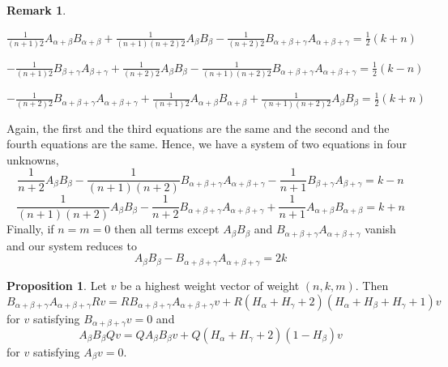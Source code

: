 \documentclass[twoside,a4paper,12pt]{article}
\theoremstyle{definition}
\newtheorem{remark}{Remark}
\newtheorem{proposition}{Proposition}
\newcommand{\ds}{\displaystyle}
\begin{document}
\begin{remark}
\begin{flushleft}
	\end{flushleft}
	\begin{flushleft}
		$\ds \frac1{(n+1)2}A_{\alpha+\beta}B_{\alpha+\beta}
			+\frac1{(n+1)(n+2)2}A_\beta B_\beta-\frac1{(n+2)2}
		B_{\alpha+\beta+\gamma}A_{\alpha+\beta+\gamma}=\frac12(k+n)$
	\end{flushleft}
	\begin{flushleft}
		$\ds -\frac1{(n+1)2}B_{\beta+\gamma}A_{\beta+\gamma}
			+\frac1{(n+2)2}A_\beta B_\beta-\frac1{(n+1)(n+2)2}
			B_{\alpha+\beta+\gamma}A_{\alpha+\beta+\gamma}=\frac12(k-n)$
	\end{flushleft}
	\begin{flushleft}
		$\ds -\frac1{(n+2)2}B_{\alpha+\beta+\gamma}A_{\alpha+\beta+\gamma}
			+\frac1{(n+1)2}A_{\alpha+\beta}B_{\alpha+\beta}
			+\frac1{(n+1)(n+2)2}A_\beta B_\beta=\frac12(k+n)$
	\end{flushleft}
	Again, the first and the third equations are the same and the second and
	the fourth equations are the same. Hence, we have a system of two
	equations in four unknowns,
	\begin{equation*}
		\frac1{n+2}A_\beta B_\beta
		-\frac1{(n+1)(n+2)}B_{\alpha+\beta+\gamma}A_{\alpha+\beta+\gamma}
		-\frac1{n+1}B_{\beta+\gamma}A_{\beta+\gamma}=k-n
	\end{equation*}
	\begin{equation*}
		\frac1{(n+1)(n+2)}A_\beta B_\beta
		-\frac1{n+2}B_{\alpha+\beta+\gamma}A_{\alpha+\beta+\gamma}
		+\frac1{n+1}A_{\alpha+\beta}B_{\alpha+\beta}=k+n
	\end{equation*}
	Finally, if $n=m=0$ then all terms except $A_\beta B_\beta$ and
	$B_{\alpha+\beta+\gamma}A_{\alpha+\beta+\gamma}$ vanish and our system
	reduces to
	\begin{equation}\label{nmnula}
		A_\beta B_\beta-B_{\alpha+\beta+\gamma}A_{\alpha+\beta+\gamma}=2k
	\end{equation}
\end{remark}

\begin{proposition}
	Let $v$ be a highest weight vector of weight $(n,k,m)$. Then
	\begin{equation}\label{bad}
		B_{\alpha+\beta+\gamma}A_{\alpha+\beta+\gamma}Rv=
		RB_{\alpha+\beta+\gamma}A_{\alpha+\beta+\gamma}v
		+R(H_\alpha+H_\gamma+2)(H_\alpha+H_\beta+H_\gamma+1)v
	\end{equation}
	for $v$ satisfying $B_{\alpha+\beta+\gamma}v=0$
	and
	\begin{equation}\label{abu}
		A_\beta B_\beta Qv=QA_\beta B_\beta v+Q(H_\alpha+H_\gamma+2)(1-H_\beta)v
	\end{equation}
	for $v$ satisfying $A_\beta v=0$.
\end{proposition}
\end{document}
